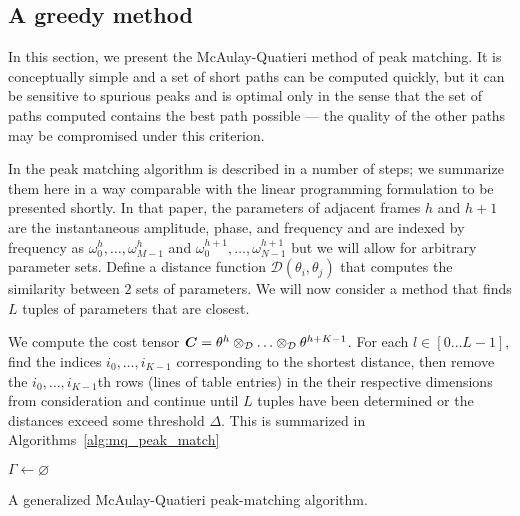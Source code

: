 \documentclass{article}
\def\argmin{\mathop{\rm arg\,min}}
\newcommand{\D}{\displaystyle}
\begin{document}
\begin{sloppy}

\section{A greedy method}

In this section, we present the McAulay-Quatieri method of peak matching. It is
conceptually simple and a set of short paths can be computed quickly, but
it can be sensitive to spurious peaks and is optimal only in the sense that
the set of paths computed contains the best path possible --- the quality of the
other paths may be compromised under this criterion.

In \cite[p.~748]{mcaulay1986speech} the peak matching algorithm is described in
a number of steps; we summarize them here in a way comparable with the linear
programming formulation to be presented shortly. In that paper, the parameters
of adjacent frames $h$ and $h+1$ are the instantaneous amplitude, phase, and
frequency and are indexed by frequency as $\omega_0^{h}, \dotsc,
\omega_{M-1}^{h}$ and $\omega_0^{h+1}, \dotsc, \omega_{N-1}^{h+1}$ but we will
allow for arbitrary parameter sets.  Define a distance function $\mathcal{D}
\left( \theta_{i},\theta_{j} \right)$ that computes the
similarity between $2$ sets of parameters. We will now consider a method that
finds $L$ tuples of parameters that are closest.

We compute the cost tensor
$
    \boldsymbol{C} = \theta^{h}
    \otimes_{\mathcal{D}} \mathellipsis \otimes_{\mathcal{D}} \theta^{h+K-1}
$.
For each $l \in \left[0 \dotsc L-1 \right]$, find the indices
$i_{0},\dotsc,i_{K-1}$ 
corresponding to the shortest
distance, then remove the $i_{0},\dotsc,i_{K-1}$th rows (lines of table entries)
in the their respective dimensions from consideration
and continue until $L$ tuples have been determined or the distances exceed some
threshold $\Delta$. This is summarized in Algorithms~\ref{alg:mq_peak_match}

\begin{algorithm}
    $\Gamma \leftarrow \varnothing$\;
    \For{$l \leftarrow 0$ to $L-1$}{
        $\D \Gamma_{l}=\argmin_{[0,\dotsc,M_{0}-1] \times
        \mathellipsis \times [0,\dotsc,M_{K-1}-1] \setminus \Gamma}
            \boldsymbol{C}$\;
            \If{$ C_{\Gamma_{l}} > \Delta$}{
            \KwRet{$\Gamma$}
        }
        $\Gamma \leftarrow \Gamma \cup C_{\Gamma_{l}}$\;
    }
    \KwRet{$\Gamma$}
    \caption{A generalized McAulay-Quatieri peak-matching algorithm.}%
    \label{alg:mq_peak_match}
\end{algorithm}


\end{sloppy}
\end{document}
